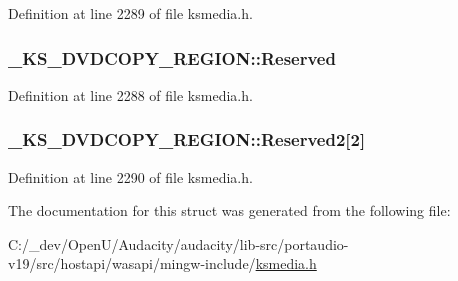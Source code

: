 Definition at line 2289 of file ksmedia.\+h.

\subsubsection[{\texorpdfstring{Reserved}{Reserved}}]{ \+\_\+\+K\+S\+\_\+\+D\+V\+D\+C\+O\+P\+Y\+\_\+\+R\+E\+G\+I\+O\+N\+::\+Reserved}\hypertarget{struct___k_s___d_v_d_c_o_p_y___r_e_g_i_o_n_acc1a0b34350c12753d6f3f465174d0eb}{}\label{struct___k_s___d_v_d_c_o_p_y___r_e_g_i_o_n_acc1a0b34350c12753d6f3f465174d0eb}


Definition at line 2288 of file ksmedia.\+h.

\subsubsection[{\texorpdfstring{Reserved2}{Reserved2}}]{ \+\_\+\+K\+S\+\_\+\+D\+V\+D\+C\+O\+P\+Y\+\_\+\+R\+E\+G\+I\+O\+N\+::\+Reserved2\mbox{[}2\mbox{]}}\hypertarget{struct___k_s___d_v_d_c_o_p_y___r_e_g_i_o_n_a07a4ae5ff1adbedc3c18f6bea1e90791}{}\label{struct___k_s___d_v_d_c_o_p_y___r_e_g_i_o_n_a07a4ae5ff1adbedc3c18f6bea1e90791}


Definition at line 2290 of file ksmedia.\+h.



The documentation for this struct was generated from the following file\+:\begin{DoxyCompactItemize}
\item 
C\+:/\+\_\+dev/\+Open\+U/\+Audacity/audacity/lib-\/src/portaudio-\/v19/src/hostapi/wasapi/mingw-\/include/\hyperlink{ksmedia_8h}{ksmedia.\+h}\end{DoxyCompactItemize}

